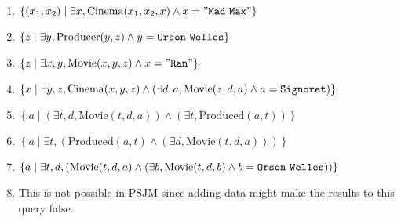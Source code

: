 \documentclass{cours}
\begin{document}
\begin{enumerate}
    \item $\left\{(x_{1}, x_{2}) \mid \exists x, \mathrm{Cinema}(x_{1}, x_{2}, x) \land x = {\tt "Mad\ Max"}\right\}$
    \item $\left\{z \mid \exists y, \mathrm{Producer}(y, z) \land y = {\tt Orson\ Welles}\right\}$
    \item $\left\{z \mid \exists x, y, \mathrm{Movie}(x, y, z) \land x = {\tt "Ran"}\right\}$
    \item $\left\{x \mid \exists y, z, \mathrm{Cinema}(x, y, z) \land \left(\exists d, a, \mathrm{Movie}(z, d, a) \land a = {\tt Signoret}\right)\right\}$
    \item $\left\{a \mid \left(\exists t, d, \mathrm{Movie}(t, d, a)\right) \land \left(\exists t, \mathrm{Produced}(a, t)\right)\right\}$
    \item $\left\{a \mid \exists t, \left(\mathrm{Produced}(a, t) \land \left(\exists d, \mathrm{Movie}(t, d, a)\right)\right)\right\}$
    \item $\left\{a \mid \exists t, d, \left(\mathrm{Movie}(t, d, a) \land \left(\exists b, \mathrm{Movie}(t, d, b) \land b = {\tt Orson\ Welles}\right)\right)\right\}$
    \item This is not possible in PSJM since adding data might make the results to this query false. 
\end{enumerate}
\end{document}
